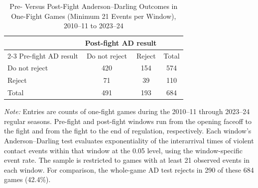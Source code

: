 \begin{table}[htbp]
\centering
\caption{Pre- Versus Post-Fight Anderson--Darling Outcomes in One-Fight Games (Minimum 21 Events per Window), 2010--11 to 2023--24}
\label{tab:one_fight_AD_rejection_min_21_20102011_20232024}
\small
\renewcommand{\arraystretch}{1.15}
\setlength{\tabcolsep}{6pt}

\begin{tabular*}{0.78\textwidth}{@{\extracolsep{\fill}}lccc}
\toprule
 & \multicolumn{2}{c}{Post-fight AD result} & \\
\cmidrule(lr){2-3}
Pre-fight AD result & Do not reject & Reject & Total \\
\midrule
Do not reject & 420 & 154 & 574 \\
Reject & 71 & 39 & 110 \\
\midrule
Total & 491 & 193 & 684 \\
\bottomrule
\end{tabular*}

\vspace{0.4em}
\parbox{0.78\textwidth}{
\footnotesize
\textit{Note:} Entries are counts of one-fight games during the 2010--11 through 2023--24 regular seasons. Pre-fight and post-fight windows run from the opening faceoff to the fight and from the fight to the end of regulation, respectively. Each window's Anderson--Darling test evaluates exponentiality of the interarrival times of violent contact events within that window at the 0.05 level, using the window-specific event rate. The sample is restricted to games with at least 21 observed events in each window. For comparison, the whole-game AD test rejects in 290 of these 684 games (42.4\%).
}
\end{table}
